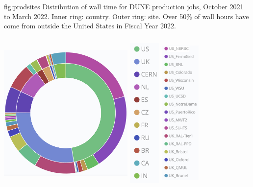 \documentclass[../main-v1.tex]{subfiles}
\begin{document}
\begin{dunefigure}
{fig:prodsites}
{Distribution of wall time for DUNE production jobs, October 2021 to March 2022. Inner ring: country. Outer ring: site. Over 50\% of wall hours have come from outside the United States in Fiscal Year 2022.}
{\includegraphics[height=3.5in,width=0.5\textwidth]{graphics/Workflow/walltimeplot.png}
\includegraphics[height=3.5in,width=0.12\textwidth]{graphics/Workflow/walltimecountry.png}
\includegraphics[height=3.5in,width=0.15\textwidth]{graphics/Workflow/walltimesite1.png}
}
\end{dunefigure}
\end{document}
